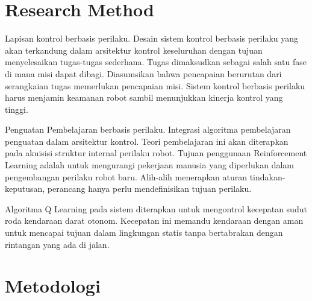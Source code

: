 \section{Research Method}



Lapisan kontrol berbasis perilaku. Desain sistem kontrol berbasis perilaku yang akan terkandung dalam arsitektur kontrol keseluruhan dengan tujuan menyelesaikan tugas-tugas sederhana. Tugas dimaksudkan sebagai salah satu fase di mana misi dapat dibagi. Diasumsikan bahwa pencapaian berurutan dari serangkaian tugas memerlukan pencapaian misi. Sistem kontrol berbasis perilaku harus menjamin keamanan robot sambil menunjukkan kinerja kontrol yang tinggi.

Penguatan Pembelajaran berbasis perilaku. Integrasi algoritma pembelajaran penguatan dalam arsitektur kontrol. Teori pembelajaran ini akan diterapkan pada akuisisi struktur internal perilaku robot. Tujuan penggunaan Reinforcement Learning adalah untuk mengurangi pekerjaan manusia yang diperlukan dalam pengembangan perilaku robot baru. Alih-alih menerapkan aturan tindakan-keputusan, perancang hanya perlu mendefinisikan tujuan perilaku.



Algoritma  Q Learning pada sistem diterapkan untuk mengontrol kecepatan sudut roda kendaraan darat otonom. Kecepatan ini memandu kendaraan dengan aman untuk mencapai tujuan dalam lingkungan statis tanpa bertabrakan dengan rintangan yang ada di jalan. 

\section{Metodologi}

